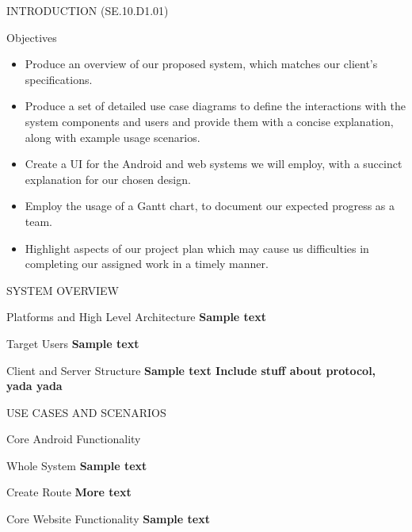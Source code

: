 \documentclass{article}
\newcommand{\qanumber}{SE.10.D1}
\begin{document}
\begin{section}{INTRODUCTION (\qanumber.01)}
\begin{subsection}{Objectives}
			\begin{itemize}
				\item{Produce an overview of our proposed system, which matches our client's specifications.}
				\item{Produce a set of detailed use case diagrams to define the interactions with the system components and users and provide them with a concise explanation, along with example usage scenarios.}
				\item{Create a UI for the Android and web systems we will employ, with a succinct explanation for our chosen design.}
				\item{Employ the usage of a Gantt chart, to document our expected progress as a team.}
				\item{Highlight aspects of our project plan which may cause us difficulties in completing our assigned work in a timely manner.}
			\end{itemize}
		\end{subsection}
	\end{section}

	\newpage
	\begin{section}{SYSTEM OVERVIEW}
		\begin{subsection}{Platforms and High Level Architecture}
			\bf{Sample text}
		\end{subsection}
		
		\begin{subsection}{Target Users}
			\bf{Sample text}
		\end{subsection}
		
		\begin{subsection}{Client and Server Structure}
			\bf{Sample text}
			Include stuff about protocol, yada yada
		\end{subsection}
	\end{section}

	\begin{section}{USE CASES AND SCENARIOS}
		\begin{subsection}{Core Android Functionality}
			\begin{subsubsection}{Whole System}
				\bf{Sample text}
			\end{subsubsection}
			
			\begin{subsubsection}{Create Route}
				\bf{More text}
			\end{subsubsection}
		\end{subsection}
		
		\begin{subsection}{Core Website Functionality}
			\bf{Sample text}
		\end{subsection}
	\end{section}
	
\end{document}
